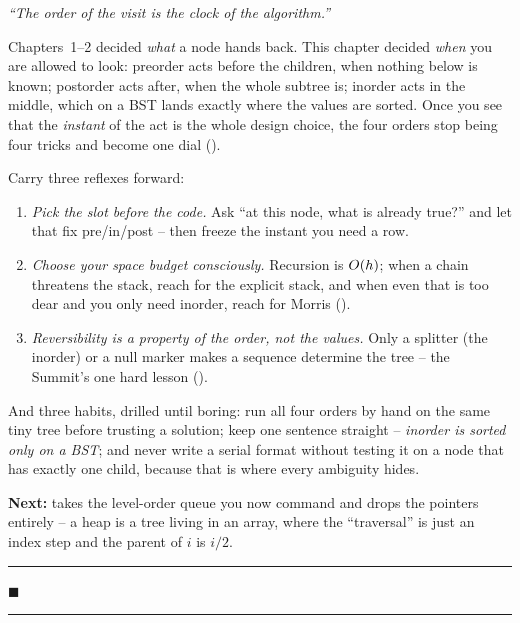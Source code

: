 \begin{lastword}
\emph{``The order of the visit is the clock of the algorithm.''}

\medskip
Chapters~1--2 decided \emph{what} a node hands back. This chapter decided \emph{when} you
are allowed to look: preorder acts before the children, when nothing below is known;
postorder acts after, when the whole subtree is; inorder acts in the middle, which on a BST
lands exactly where the values are sorted. Once you see that the \emph{instant} of the act
is the whole design choice, the four orders stop being four tricks and become one dial
().

\medskip
Carry three reflexes forward:
\begin{enumerate}[nosep, leftmargin=1.6em]
  \item \emph{Pick the slot before the code.} Ask ``at this node, what is already true?''
        and let that fix pre/in/post -- then freeze  the instant you need a
        row.
  \item \emph{Choose your space budget consciously.} Recursion is $O(h)$; when a chain
        threatens the stack, reach for the explicit stack, and when even that is too
        dear and you only need inorder, reach for Morris ().
  \item \emph{Reversibility is a property of the order, not the values.} Only a splitter
        (the inorder) or a null marker makes a sequence determine the tree -- the Summit's
        one hard lesson ().
\end{enumerate}

\medskip
And three habits, drilled until boring: run all four orders by hand on the same tiny tree
before trusting a solution; keep one sentence straight -- \emph{inorder is sorted only on a
BST}; and never write a serial format without testing it on a node that has exactly one
child, because that is where every ambiguity hides.

\medskip
\textbf{Next:}  takes the level-order queue you now command and drops the
pointers entirely -- a heap is a tree living in an array, where the ``traversal'' is just
an index step and the parent of $i$ is $i/2$.

\begin{center}\textcolor{softpurple}{\rule{0.4\linewidth}{0.6pt}\quad $\blacksquare$\quad \rule{0.4\linewidth}{0.6pt}}\end{center}
\end{lastword}
